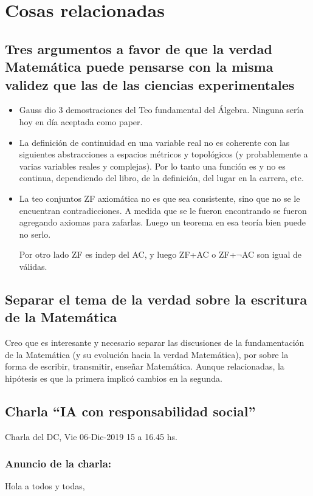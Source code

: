 \documentclass[a4paper,11pt]{article}
\begin{document}
\section{Cosas relacionadas}
\subsection{Tres argumentos a favor de que la verdad Matemática puede pensarse con la misma validez que las de las ciencias experimentales}
\begin{itemize}
	\item Gauss dio 3 demostraciones del Teo fundamental del Álgebra. Ninguna sería hoy en día aceptada como paper.
	\item La definición de continuidad en una variable real no es coherente con las siguientes abstracciones a espacios métricos y topológicos (y probablemente a varias variables reales y complejas). Por lo tanto una función es y no es continua, dependiendo del libro, de la definición, del lugar en la carrera, etc.
	\item La teo conjuntos ZF axiomática no es que sea consistente, sino que no se le encuentran contradicciones. A medida que se le fueron encontrando se fueron agregando axiomas para zafarlas. Luego un teorema en esa teoría bien puede no serlo.
	
	Por otro lado ZF es indep del AC, y luego ZF+AC o ZF+$\neg$AC son igual de válidas.
\end{itemize}

\subsection{Separar el tema de la verdad sobre la escritura de la Matemática}
Creo que es interesante y necesario separar las discusiones de la fundamentación de la Matemática (y su evolución hacia la verdad Matemática), por sobre la forma de escribir, transmitir, enseñar Matemática. Aunque relacionadas, la hipótesis es que la primera implicó cambios en la segunda.


\subsection{Charla ``IA con responsabilidad social''}
Charla del DC, Vie 06-Dic-2019 15 a 16.45 hs.

\subsubsection{Anuncio de la charla: } Hola a todos y todas,
\end{document}

